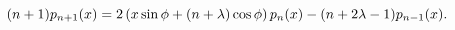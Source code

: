 \[(n+1)p_{n+1}(x)=2\left(x\mathop{\sin\/}\nolimits\phi+(n+\lambda)\mathop{\cos\/%
}\nolimits\phi\right)p_{n}(x)-(n+2\lambda-1)p_{n-1}(x).\]